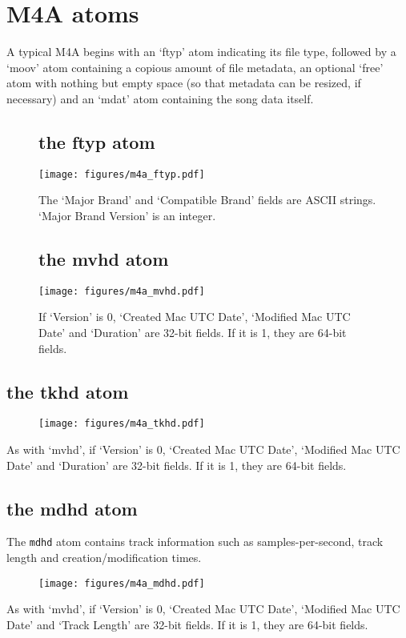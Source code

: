 \section{M4A atoms}
A typical M4A begins with an `ftyp' atom indicating its file type,
followed by a `moov' atom containing a copious amount of file metadata,
an optional `free' atom with nothing but empty space
(so that metadata can be resized, if necessary) and an `mdat' atom
containing the song data itself.
\begin{figure}[h]
\subsection{the ftyp atom}
\texttt{[image: figures/m4a\_ftyp.pdf]}
\par
The `Major Brand' and `Compatible Brand' fields are ASCII strings.
`Major Brand Version' is an integer.

\subsection{the mvhd atom}
\texttt{[image: figures/m4a\_mvhd.pdf]}
\par
If `Version' is 0, `Created Mac UTC Date', `Modified Mac UTC Date' and
`Duration' are 32-bit fields.  If it is 1, they are 64-bit fields.
\end{figure}

\pagebreak

\subsection{the tkhd atom}
\par
\begin{figure}[h]
\texttt{[image: figures/m4a\_tkhd.pdf]}
\end{figure}
\par
\noindent
As with `mvhd', if `Version' is 0, `Created Mac UTC Date',
`Modified Mac UTC Date' and `Duration' are 32-bit fields.
If it is 1, they are 64-bit fields.

\subsection{the mdhd atom}

The \texttt{mdhd} atom contains track information such as samples-per-second,
track length and creation/modification times.

\begin{figure}[h]
\texttt{[image: figures/m4a\_mdhd.pdf]}
\end{figure}
\par
\noindent
As with `mvhd', if `Version' is 0, `Created Mac UTC Date',
`Modified Mac UTC Date' and `Track Length' are 32-bit fields.
If it is 1, they are 64-bit fields.

